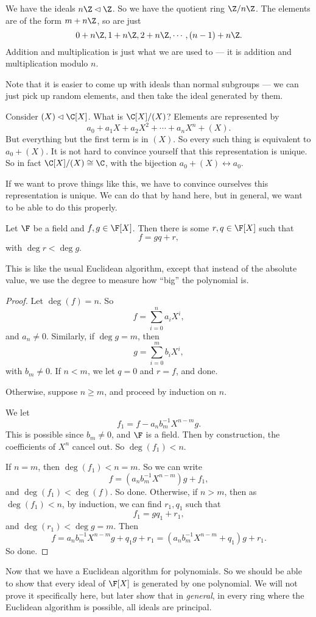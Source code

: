 \documentclass[a4paper]{article}
\begin{document}
\begin{eg}
  We have the ideals $n\Z \lhd \Z$. So we have the quotient ring $\Z / n\Z$. The elements are of the form $m + n\Z$, so are just
  \[
    0 + n\Z, 1 + n\Z, 2 + n\Z, \cdots, (n - 1) + n\Z.
  \]
  Addition and multiplication is just what we are used to --- it is addition and multiplication modulo $n$.
\end{eg}

Note that it is easier to come up with ideals than normal subgroups --- we can just pick up random elements, and then take the ideal generated by them.
\begin{eg}
  Consider $(X) \lhd \C[X]$. What is $\C[X]/(X)$? Elements are represented by
  \[
    a_0 + a_1 X + a_2 X^2 + \cdots + a_n X^n + (X).
  \]
  But everything but the first term is in $(X)$. So every such thing is equivalent to $a_0 + (X)$. It is not hard to convince yourself that this representation is unique. So in fact $\C[X]/(X) \cong \C$, with the bijection $a_0 + (X) \leftrightarrow a_0$.
\end{eg}
If we want to prove things like this, we have to convince ourselves this representation is unique. We can do that by hand here, but in general, we want to be able to do this properly.

\begin{prop}
  Let $\F$ be a field and $f, g \in \F[X]$. Then there is some $r, q \in \F[X]$ such that
  \[
    f = gq + r,
  \]
  with $\deg r < \deg g$.
\end{prop}
This is like the usual Euclidean algorithm, except that instead of the absolute value, we use the degree to measure how ``big'' the polynomial is.

\begin{proof}
  Let $\deg (f) = n$. So
  \[
    f = \sum_{i = 0}^n a_i X^i,
  \]
  and $a_n \not= 0$. Similarly, if $\deg g = m$, then
  \[
    g = \sum_{i = 0}^m b_i X^i,
  \]
  with $b_m \not= 0$. If $n < m$, we let $q = 0$ and $r = f$, and done.

  Otherwise, suppose $n \geq m$, and proceed by induction on $n$.

  We let
  \[
    f_1 = f - a_n b_m^{-1} X^{n - m} g.
  \]
  This is possible since $b_m \not= 0$, and $\F$ is a field. Then by construction, the coefficients of $X^n$ cancel out. So $\deg (f_1) < n$.

  If $n = m$, then $\deg (f_1) < n = m$. So we can write
  \[
    f = (a_n b_m^{-1} X^{n - m})g + f_1,
  \]
  and $\deg(f_1) < \deg(f)$. So done. Otherwise, if $n > m$, then as $\deg(f_1) < n$, by induction, we can find $r_1, q_1$ such that
  \[
    f_1 = g q_1 + r_1,
  \]
  and $\deg (r_1) < \deg g = m$. Then
  \[
    f = a_nb_m^{-1} X^{n - m} g + q_1 g + r_1 = (a_n b_m^{-1}X^{n - m} + q_1) g + r_1.
  \]
  So done.
\end{proof}
Now that we have a Euclidean algorithm for polynomials. So we should be able to show that every ideal of $\F[X]$ is generated by one polynomial. We will not prove it specifically here, but later show that in \emph{general}, in every ring where the Euclidean algorithm is possible, all ideals are principal.
\end{document}
